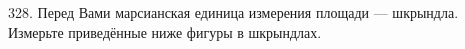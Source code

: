 328. Перед Вами марсианская единица измерения площади --- шкрындла. Измерьте приведённые ниже фигуры в
шкрындлах.\\
\begin{figure}[ht!]
\end{figure}\\
